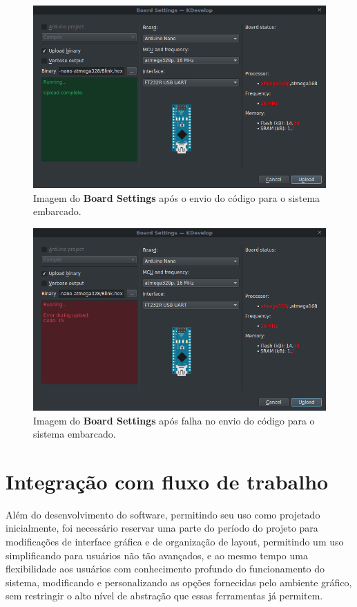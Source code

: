 \begin{figure}[!htb]
  \centering
  \caption[Board Settings com sucesso no envio]{Imagem do \textbf{Board Settings} após o envio do código para o sistema embarcado.}
  \label{fig:boardsettingsdone}
  \includegraphics[width=1\textwidth]{figuras/boardsettingsdone.png}
\end{figure}

\begin{figure}[!htb]
  \centering
  \caption[Board Settings com falha no envio]{Imagem do \textbf{Board Settings} após falha no envio do código para o sistema embarcado.}
  \label{fig:boardsettingsndone}
  \includegraphics[width=1\textwidth]{figuras/boardsettingsndone.png}
\end{figure}

\section{Integração com fluxo de trabalho}
Além do desenvolvimento do software, permitindo seu uso como projetado inicialmente, foi necessário reservar uma parte do período do projeto para modificações de interface gráfica e de organização de layout, permitindo um uso simplificando para usuários não tão avançados, e ao mesmo tempo uma flexibilidade aos usuários com conhecimento profundo do funcionamento do sistema, modificando e personalizando as opções fornecidas pelo ambiente gráfico, sem restringir o alto nível de abstração que essas ferramentas já permitem.


